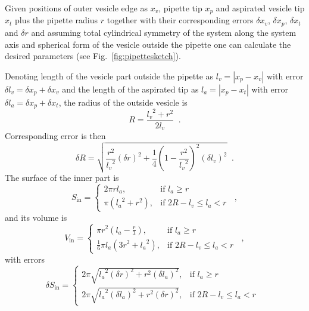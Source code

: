 Given positions of outer vesicle edge as $x_v$, pipette tip $x_p$ and aspirated vesicle tip $x_t$ plus the pipette radius $r$ together with their corresponding errors $\delta x_v$, $\delta x_p$, $\delta x_t$ and $\delta r$ and assuming total cylindrical symmetry of the system along the system axis and spherical form of the vesicle outside the pipette one can calculate the desired parameters (see Fig.~\ref{fig:pipettesketch}).

Denoting length of the vesicle part outside the pipette as $l_v = \left|x_p-x_v\right|$ with error $\delta l_v = \delta x_p + \delta x_v$ and the length of the aspirated tip as $l_a = \left|x_p-x_t\right|$ with error $\delta l_a = \delta x_p + \delta x_t$, the radius of the outside vesicle is
\begin{equation*}
R = \frac{{l_v}^2 + r^2}{2l_v}\;\;.
\end{equation*}
Corresponding error is then
\begin{equation*}
 \delta R = \sqrt{\frac{r^2}{{l_v}^2} \left(\delta r\right)^2 + \frac{1}{4}\left(1-\frac{r^2}{{l_v}^2}\right)^2 \left( \delta l_v\right) ^2}\;\;.
\end{equation*}
The surface of the inner part is
\begin{equation*}
S_\text{in} = \left\{
\begin{array}{ll}
	2\pi rl_a,& \text{if } l_a \geq r\\
	\pi\left({l_a}^2+r^2\right),&\text{if } 2R-l_v \leq l_a < r
\end{array}
\right.\;\;,
\end{equation*}
and its volume is
\begin{equation*}
V_{\text{in}} = \left\{
\begin{array}{ll}
	\pi r^2\left(l_a-\frac{r}{3}\right), & \text{if } l_a \geq r\\
	\frac{1}{6}\pi l_a\left(3r^2+{l_a}^2\right),&\text{if } 2R-l_v \leq l_a < r
\end{array}
\right.\;\;,
\end{equation*}
with errors
\begin{equation*}
 \delta S_\text{in} = \left\{
 \begin{array}{ll}
	2\pi \sqrt{{l_a}^2\left(\delta r\right)^2 + r^2\left(\delta l_a\right)^2},& \text{if } l_a \geq r\\
	2\pi \sqrt{{l_a}^2\left(\delta l_a\right)^2 + r^2\left(\delta r\right)^2},&\text{if } 2R-l_v \leq l_a < r
\end{array}
\right.\;\;
\end{equation*}
